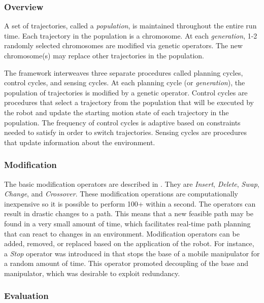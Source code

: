 \documentclass[10pt,conference]{ieeeconf}
\begin{document}
\subsubsection{Overview}\label{subseq:RAMP Overview}

A set of trajectories, called a \emph{population}, is maintained throughout the entire run time. Each trajectory in the population is a chromosome. At each \emph{generation}, 1-2 randomly selected chromosomes are modified via genetic operators. The new chromosome(s) may replace other trajectories in the population. 


The framework interweaves three separate procedures called planning cycles, control cycles, and sensing cycles. At each planning cycle (or \emph{generation}), the population of trajectories is modified by a genetic operator. Control cycles are procedures that select a trajectory from the population that will be executed by the robot and update the starting motion state of each trajectory in the population. The frequency of control cycles is adaptive based on constraints needed to satisfy in order to switch trajectories. Sensing cycles are procedures that update information about the environment.


\subsubsection{Modification}


The basic modification operators are described in \cite{EPN_Adaptive}. They are \emph{Insert}, \emph{Delete}, \emph{Swap}, \emph{Change}, and \emph{Crossover}. These modification operations are computationally inexpensive so it is possible to perform 100+ within a second. The operators can result in drastic changes to a path. This means that a new feasible path may be found in a very small amount of time, which facilitates real-time path planning that can react to changes in an environment. Modification operators can be added, removed, or replaced based on the application of the robot. For instance, a \emph{Stop} operator was introduced in \cite{RAMP} that stops the base of a mobile manipulator for a random amount of time. This operator promoted decoupling of the base and manipulator, which was desirable to exploit redundancy. 


\subsubsection{Evaluation}
\end{document}
